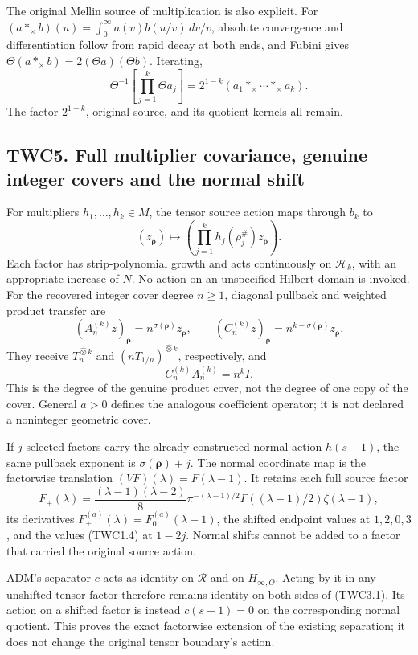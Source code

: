 The original Mellin source of multiplication is also explicit. For
\((a*_\times b)(u)=\int_0^\infty a(v)b(u/v)\,dv/v\), absolute
convergence and differentiation follow from rapid decay at both ends,
and Fubini gives \(\Theta(a*_\times b)=2(\Theta a)(\Theta b)\).
Iterating, \[
\Theta^{-1}\left[\prod_{j=1}^k\Theta a_j\right]
=2^{1-k}(a_1*_\times\cdots*_\times a_k).
\tag{TWC4.7}
\] The factor \(2^{1-k}\), original source, and its quotient kernels all
remain.

\subsection{TWC5. Full multiplier covariance, genuine integer covers and
the normal
shift}\label{twc5.-full-multiplier-covariance-genuine-integer-covers-and-the-normal-shift}

For multipliers \(h_1,\ldots,h_k\in M\), the tensor source action maps
through \(b_k\) to \[
(z_{\boldsymbol\rho})\longmapsto
\left(\prod_{j=1}^kh_j(\rho_j^\#)z_{\boldsymbol\rho}\right).
\tag{TWC5.1}
\] Each factor has strip-polynomial growth and acts continuously on
\(\mathscr H_k\), with an appropriate increase of \(N\). No action on an
unspecified Hilbert domain is invoked. For the recovered integer cover
degree \(n\ge1\), diagonal pullback and weighted product transfer are \[
(A_n^{(k)}z)_{\boldsymbol\rho}=n^{\sigma(\boldsymbol\rho)}z_{\boldsymbol\rho},
\qquad
(C_n^{(k)}z)_{\boldsymbol\rho}=n^{k-\sigma(\boldsymbol\rho)}z_{\boldsymbol\rho}.
\tag{TWC5.2}
\] They receive \(T_n^{\widehat\otimes k}\) and
\((nT_{1/n})^{\widehat\otimes k}\), respectively, and \[
C_n^{(k)}A_n^{(k)}=n^k I.
\tag{TWC5.3}
\] This is the degree of the genuine product cover, not the degree of
one copy of the cover. General \(a>0\) defines the analogous coefficient
operator; it is not declared a noninteger geometric cover.

If \(j\) selected factors carry the already constructed normal action
\(h(s+1)\), the same pullback exponent is \(\sigma(\boldsymbol\rho)+j\).
The normal coordinate map is the factorwise translation
\((VF)(\lambda)=F(\lambda-1)\). It retains each full source factor \[
F_+(\lambda)=\frac{(\lambda-1)(\lambda-2)}8\pi^{-(\lambda-1)/2}
\Gamma((\lambda-1)/2)\zeta(\lambda-1),
\tag{TWC5.4}
\] its derivatives \(F_+^{(a)}(\lambda)=F_0^{(a)}(\lambda-1)\), the
shifted endpoint values at \(1,2,0,3\), and the values (TWC1.4) at
\(1-2j\). Normal shifts cannot be added to a factor that carried the
original source action.

ADM's separator \(c\) acts as identity on \(\mathcal R\) and on
\(H_{\infty,O}\). Acting by it in any unshifted tensor factor therefore
remains identity on both sides of (TWC3.1). Its action on a shifted
factor is instead \(c(s+1)=0\) on the corresponding normal quotient.
This proves the exact factorwise extension of the existing separation;
it does not change the original tensor boundary's action.

